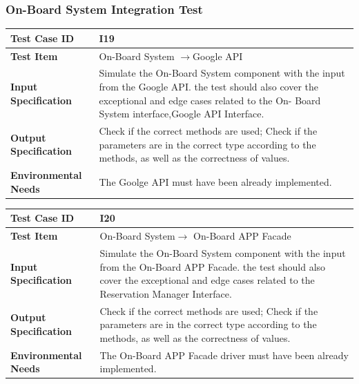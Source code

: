 \documentclass[a4paper,11pt]{article}
\begin{document}
		\subsubsection{On-Board System Integration Test}
		\begin{table}[H] 
\begin{center}
\renewcommand\arraystretch{1.5}
\begin{tabular}{|p{5cm}|p{7cm}|}
 \hline
\textbf{Test Case ID}& I19\\
 \hline
\textbf{Test Item}&On-Board System $\rightarrow$Google API\\
 \hline
\textbf{Input Specification}&Simulate the On-Board System component with the input from the Google API. the test should also cover the exceptional and edge cases related to the On- Board System interface,Google API Interface.\\
 \hline
\textbf{Output Specification}&Check if the correct methods are used;
Check if the parameters are in the correct type according to the methods, as well as the correctness of values.\\
 \hline
 \textbf{Environmental Needs}&The Goolge API must have been already implemented.\\
 \hline
\end{tabular}
\end{center}
\end{table}		
\begin{table}[H] 
\begin{center}
\renewcommand\arraystretch{1.5}
\begin{tabular}{|p{5cm}|p{7cm}|}
 \hline
\textbf{Test Case ID}& I20\\
 \hline
\textbf{Test Item}&On-Board System$\rightarrow$ On-Board APP Facade\\
 \hline
\textbf{Input Specification}&Simulate the On-Board System component with the input from the On-Board APP Facade. the test should also cover the exceptional and edge cases related to the Reservation Manager Interface.\\
 \hline
\textbf{Output Specification}&Check if the correct methods are used;
Check if the parameters are in the correct type according to the methods, as well as the correctness of values.\\
 \hline
 \textbf{Environmental Needs}&The On-Board APP Facade driver must have been already implemented.\\
 \hline
\end{tabular}
\end{center}
\end{table}		
	
\end{document}
